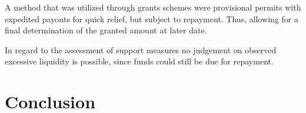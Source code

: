 A method that was utilized through grants schemes were provisional permits with expedited payouts for quick relief, but subject to repayment. Thus, allowing for a final determination of the granted amount at later date. 

In regard to the assessment of support measures no judgement on observed excessive liquidity is possible, since funds could still be due for repayment.





\section{Conclusion}

